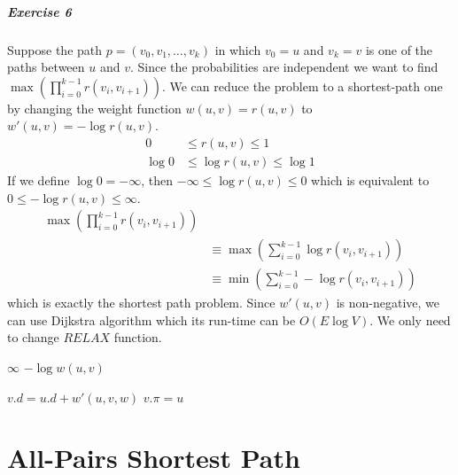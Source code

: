 \documentclass{book}
\begin{document}
	\paragraph{Exercise 6}
	Suppose the path $p = (v_0, v_1, \dots, v_k)$ in which $v_0 = u$ and $v_k = v$ is one of the paths between $u$ and $v$. Since the probabilities are independent we want to find $\max(\prod_{i = 0}^{k - 1}r(v_i, v_{i+1}))$. We can reduce the problem to a shortest-path one by changing the weight function $w(u, v) = r(u, v)$ to $w'(u, v) = -\log{r(u, v)}$.
	\begin{equation*}
	\begin{split}
		0 &\le r(u, v) \le 1 \\
		\log 0 &\le \log{r(u, v)} \le \log 1
	\end{split}
	\end{equation*}
	If we define $\log 0 = -\infty$, then $-\infty \le \log{r(u, v)} \le 0$ which is equivalent to $0 \le -\log{r(u, v)} \le \infty$.
	\begin{equation*}
	\begin{split}
		\max(\prod_{i = 0}^{k - 1}r(v_i, v_{i+1})) \\
		&\equiv \max(\sum_{i = 0}^{k - 1}\log{r(v_i, v_{i+1})}) \\
		&\equiv \min(\sum_{i = 0}^{k - 1}-\log{r(v_i, v_{i+1})})
	\end{split}
	\end{equation*}
	which is exactly the shortest path problem. Since $w'(u, v)$ is non-negative, we can use Dijkstra algorithm which its run-time can be $O(E\log V)$. We only need to change $RELAX$ function.
	\begin{algorithm*}[h!]
		\begin{algorithmic}[1]
					\State \Return $\infty$
				\Else
					\State \Return $-\log{w(u, v)}$
				\EndIf
			\EndFunction
		\end{algorithmic}
	\end{algorithm*}
	\begin{algorithm*}
		\begin{algorithmic}[1]
					\State $v.d = u.d + w'(u, v, w)$
					\State $v.\pi = u$
				\EndIf
			\EndFunction
		\end{algorithmic}
	\end{algorithm*}	
	\FloatBarrier
	\chapter{All-Pairs Shortest Path}
\end{document}

